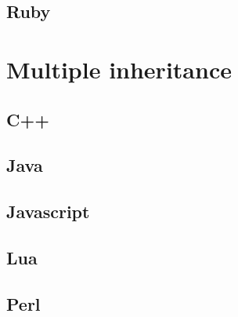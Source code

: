 \documentclass{KodeBook}
\begin{document}

\subsection{Ruby}




\section{Multiple inheritance}

\subsection{C++}


\subsection{Java}


\subsection{Javascript} 


\subsection{Lua}


\subsection{Perl}

\end{document}
